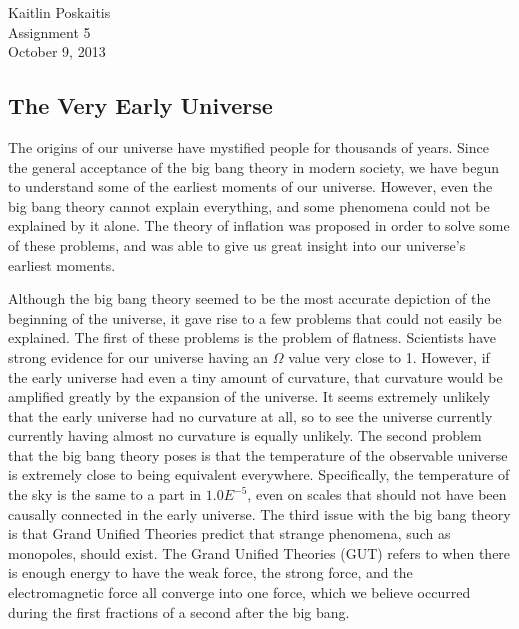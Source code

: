 \documentclass[12pt]{article}
\begin{document}
\noindent Kaitlin Poskaitis\\
Assignment 5\\
October 9, 2013
\begin{center}
    \section*{\bf The Very Early Universe}
\end{center}

The origins of our universe have mystified people for thousands of years.  Since
the general acceptance of the big bang theory in modern society, we have begun
to understand some of the earliest moments of our universe.  However, even the
big bang theory cannot explain everything, and some phenomena could not be
explained by it alone.  The theory of inflation was proposed in order to solve
some of these problems, and was able to give us great insight into our
universe's earliest moments.

Although the big bang theory seemed to be the most accurate depiction of the
beginning of the universe, it gave rise to a few problems that could not easily
be explained.  The first of these problems is the problem of flatness.
Scientists have strong evidence for our universe having an $\Omega$ value very
close to 1.  However, if the early universe had even a tiny amount of curvature,
that curvature would be amplified greatly by the expansion of the universe. It
seems extremely unlikely that the early universe had no curvature at all, so to
see the universe currently currently having almost no curvature is equally
unlikely.  The second problem that the big bang theory poses is that the
temperature of the observable universe is extremely close to being equivalent
everywhere.  Specifically, the temperature of the sky is the same to a part in
$1.0E^{-5}$, even on scales that should not have been causally connected in the
early universe.  The third issue with the big bang theory is that Grand Unified
Theories
predict that strange phenomena, such as monopoles, should exist.  The Grand
Unified Theories (GUT) refers to when there is enough energy to have the weak
force, the strong force, and the electromagnetic force all converge into one
force, which we believe occurred during the first fractions of a second after the
big bang.
\end{document}
